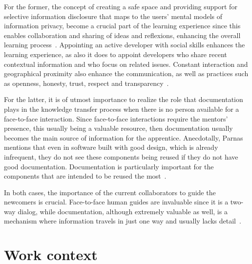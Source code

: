 \documentclass[12pt, letterpaper]{article}
\begin{document}
For the 
former, the concept of creating a safe space and providing support for selective information disclosure that
maps to the users' mental models of information privacy, become a crucial part of the learning
experience since this enables collaboration and sharing of ideas and reflexions, enhancing
the overall learning process~\cite{Razavi06}. Appointing an active developer with social skills
enhances the learning experience, as also it does to appoint developers who share recent
contextual information and who focus on related issues\cite{Steinmacher12}. Constant interaction
and geographical proximity also enhance the communication, as well as practices such as 
openness, honesty, trust, respect and transparency~\cite{Whitworth06}. 

For the latter,
it is of utmost importance to realize the role that documentation plays in the knowledge transfer
process when there is no person available for a face-to-face interaction. Since face-to-face interactions
require the mentors' presence, this usually being a valuable resource, then documentation usually
becomes the main source of information for the apprentice. Anecdotally, Parnas mentions that even
in software built with good design, which is already infrequent, they do not see these components being
reused if they do not have good documentation\cite{brooks95}. Documentation is particularly important 
for the components that are intended to be reused the most~\cite{monperrus11}.

In both cases, the importance of the current collaborators to guide the newcomers is crucial.
Face-to-face human guides are invaluable since it is a two-way dialog, while documentation,
although extremely valuable as well, is a mechanism
where information travels in just one way and usually lacks detail~\cite{Dagenais10}.


 


 
\section{Work context}
\end{document}
